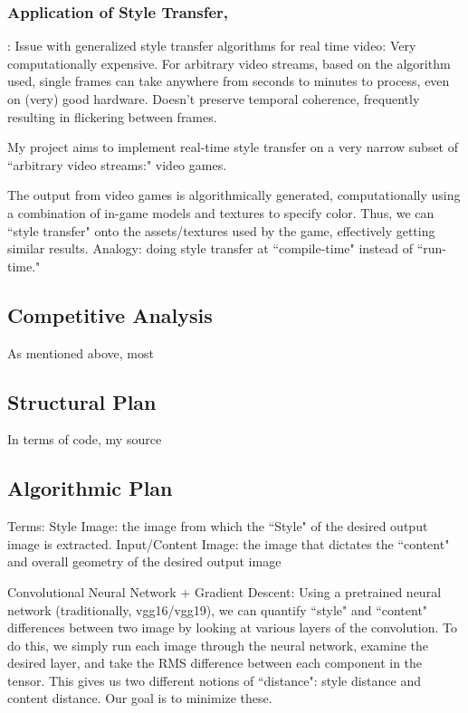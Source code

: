\documentclass[12pt]{article}
\begin{document}
    \subsubsection{Application of Style Transfer, }:
    Issue with generalized style transfer algorithms for real time video: 
    Very computationally expensive. For arbitrary video streams, based on the algorithm used, single frames can take anywhere from seconds to minutes to process, even on (very) good hardware. 
    Doesn't preserve temporal coherence, frequently resulting in flickering between frames. 

    My project aims to implement real-time style transfer on a very narrow subset of ``arbitrary video streams:" video games.

    The output from video games is algorithmically generated, computationally using a combination of in-game models and textures to specify color.
    Thus, we can ``style transfer" onto the assets/textures used by the game, effectively getting similar results. 
    Analogy: doing style transfer at ``compile-time" instead of ``run-time."

\subsection{Competitive Analysis}
    As mentioned above, most 
\subsection{Structural Plan}
    In terms of code, my source 
\subsection{Algorithmic Plan}

    Terms:
    Style Image: the image from which the ``Style" of the desired output image is extracted.
    Input/Content Image: the image that dictates the ``content" and overall geometry of the desired output image

    Convolutional Neural Network + Gradient Descent:
    Using a pretrained neural network (traditionally, vgg16/vgg19), we can quantify ``style" and ``content" differences between two image by looking at various layers of the convolution. To do this, we simply run each image through the neural network, examine the desired layer, and take the RMS difference between each component in the tensor. 
    This gives us two different notions of ``distance": style distance and content distance. Our goal is to minimize these. 
\end{document}
